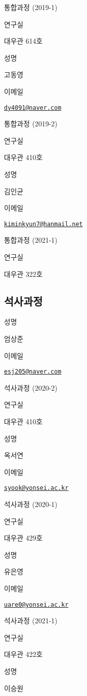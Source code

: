\documentclass[]{book}
\begin{document}
통합과정 (2019-1)

연구실

대우관 614호

성명

고동영

이메일

\href{mailto:dy4091@naver.com}{\nolinkurl{dy4091@naver.com}}

통합과정 (2019-2)

연구실

대우관 410호

성명

김인균

이메일

\href{mailto:kiminkyun7@hanmail.net}{\nolinkurl{kiminkyun7@hanmail.net}}

통합과정 (2021-1)

연구실

대우관 322호

\hypertarget{uxc11duxc0acuxacfcuxc815}{%
\subsection*{석사과정}\label{uxc11duxc0acuxacfcuxc815}}

성명

엄상준

이메일

\href{mailto:esj205@naver.com}{\nolinkurl{esj205@naver.com}}

석사과정 (2020-2)

연구실

대우관 410호

성명

옥서연

이메일

\href{mailto:syook@yonsei.ac.kr}{\nolinkurl{syook@yonsei.ac.kr}}

석사과정 (2020-1)

연구실

대우관 429호

성명

유은영

이메일

\href{mailto:uare0@yonsei.ac.kr}{\nolinkurl{uare0@yonsei.ac.kr}}

석사과정 (2021-1)

연구실

대우관 422호

성명

이승원
\end{document}
